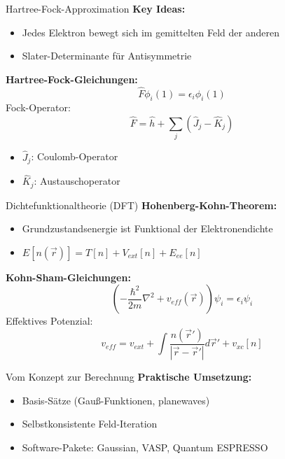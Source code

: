 \begin{frame}{Hartree-Fock-Approximation}
    \textbf{Key Ideas:}
    \begin{itemize}
        \item Jedes Elektron bewegt sich im gemittelten Feld der anderen
        \item Slater-Determinante für Antisymmetrie
    \end{itemize}

    \textbf{Hartree-Fock-Gleichungen:}
    \[
        \hat{F}\phi_i(1) = \epsilon_i\phi_i(1)
    \]
    Fock-Operator:
    \[
        \hat{F} = \hat{h} + \sum_j (\hat{J}_j - \hat{K}_j)
    \]
    \begin{itemize}
        \item $\hat{J}_j$: Coulomb-Operator
        \item $\hat{K}_j$: Austauschoperator
    \end{itemize}
\end{frame}

\begin{frame}{Dichtefunktionaltheorie (DFT)}
    \textbf{Hohenberg-Kohn-Theorem:}
    \begin{itemize}
        \item Grundzustandsenergie ist Funktional der Elektronendichte
        \item $E[n(\vec{r})] = T[n] + V_{ext}[n] + E_{ee}[n]$
    \end{itemize}

    \textbf{Kohn-Sham-Gleichungen:}
    \[
        \left(-\frac{\hbar^2}{2m}\nabla^2 + v_{eff}(\vec{r})\right)\psi_i = \epsilon_i\psi_i
    \]
    Effektives Potenzial:
    \[
        v_{eff} = v_{ext} + \int \frac{n(\vec{r}')}{|\vec{r}-\vec{r}'|}d\vec{r}' + v_{xc}[n]
    \]
\end{frame}

\begin{frame}{Vom Konzept zur Berechnung}
    \textbf{Praktische Umsetzung:}
    \begin{itemize}
        \item Basis-Sätze (Gauß-Funktionen, planewaves)
        \item Selbstkonsistente Feld-Iteration
        \item Software-Pakete: Gaussian, VASP, Quantum ESPRESSO
    \end{itemize}

\end{frame}

